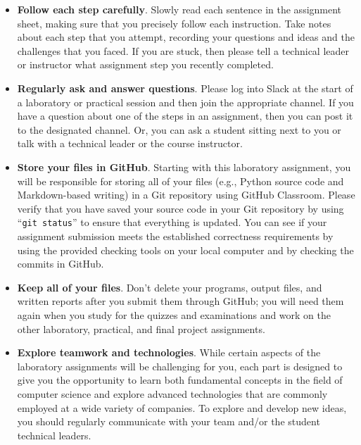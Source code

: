 \documentclass[11pt]{article}
\newcommand{\command}[1]{``\lstinline{#1}''}
\begin{document}
\begin{itemize}
  \setlength{\itemsep}{0pt}

\item {\bf Follow each step carefully}. Slowly read each sentence in the
  assignment sheet, making sure that you precisely follow each instruction. Take
  notes about each step that you attempt, recording your questions and ideas and
  the challenges that you faced. If you are stuck, then please tell a technical
  leader or instructor what assignment step you recently completed.

\item {\bf Regularly ask and answer questions}. Please log into Slack at the
  start of a laboratory or practical session and then join the appropriate
  channel. If you have a question about one of the steps in an assignment, then
  you can post it to the designated channel. Or, you can ask a student sitting
  next to you or talk with a technical leader or the course instructor.

\item {\bf Store your files in GitHub}. Starting with this laboratory
  assignment, you will be responsible for storing all of your files (e.g.,
  Python source code and Markdown-based writing) in a Git repository using
  GitHub Classroom. Please verify that you have saved your source code in your
  Git repository by using \command{git status} to ensure that everything is
  updated. You can see if your assignment submission meets the established
  correctness requirements by using the provided checking tools on your local
  computer and by checking the commits in GitHub.

\item {\bf Keep all of your files}. Don't delete your programs, output files,
  and written reports after you submit them through GitHub; you will need them
  again when you study for the quizzes and examinations and work on the other
  laboratory, practical, and final project assignments.

\item {\bf Explore teamwork and technologies}. While certain aspects of the
  laboratory assignments will be challenging for you, each part is designed to
  give you the opportunity to learn both fundamental concepts in the field of
  computer science and explore advanced technologies that are commonly employed
  at a wide variety of companies. To explore and develop new ideas, you should
  regularly communicate with your team and/or the student technical leaders.


\end{itemize}
\end{document}
